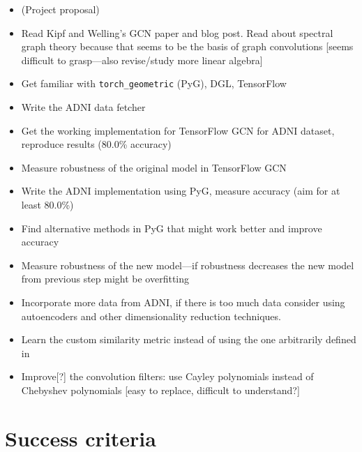 \documentclass[12pt,a4paper,twoside]{article}
\begin{document}
\begin{itemize}
  \item (Project proposal)
  \item Read Kipf and Welling's GCN paper \cite{kipf2017semi} and blog post. Read about spectral graph theory because that seems to be the basis of graph convolutions [seems difficult to grasp—also revise/study more linear algebra]
  \item Get familiar with \texttt{torch\_geometric} (PyG), DGL, TensorFlow
  \item Write the ADNI data fetcher
  \item Get the working implementation for TensorFlow GCN for ADNI dataset, reproduce results (80.0\% accuracy)
  \item Measure robustness of the original model in TensorFlow GCN
  \item Write the ADNI implementation using PyG, measure accuracy (aim for at least 80.0\%)
  \item Find alternative methods in PyG that might work better and improve accuracy
  \item Measure robustness of the new model—if robustness decreases the new model from previous step might be overfitting
  \item Incorporate more data from ADNI, if there is too much data consider using autoencoders and other dimensionality reduction techniques.
  \item Learn the custom similarity metric instead of using the one arbitrarily defined in \cite{parisot2017spectral, parisot2018disease}
  \item Improve[?] the convolution filters: use Cayley polynomials instead of Chebyshev polynomials [easy to replace, difficult to understand?]
\end{itemize}

\section*{Success criteria}


\end{document}

